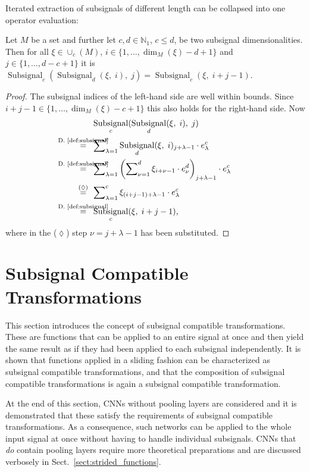\documentclass[journal]{IEEEtran}
\newcommand{\N}{\mathbb{N}}
\newcommand{\discint}[2]{\{#1,\dotsc,#2\}}
\newcommand{\inint}[2]{\in\discint{#1}{#2}}
\DeclareMathOperator{\Subsignal}{Subsignal}
\newcommand{\equsing}[1]{\overset{\mathclap{\text{#1}}}{=}}
\begin{document}
Iterated extraction of subsignals of different length can be collapsed into one operator evaluation:
\begin{lemma}
\label{lem:subsignal-composition}
Let $M$ be a set and further let $c,d\in\N_1$, $c\leq d$, be two subsignal dimensionalities.
Then for all $\xi\in\cup_c(M)$, $i\inint{1}{\dim_M(\xi) - d + 1}$ and $j\inint{1}{d - c + 1}$ it is $\Subsignal_c(\Subsignal_d(\xi,\; i),\; j) = \Subsignal_c(\xi,\; i + j - 1)$.
\end{lemma}
\begin{proof}
The subsignal indices of the left-hand side are well within bounds.
Since $i + j - 1 \inint{1}{\dim_M(\xi) - c + 1}$ this also holds for the right-hand side.
Now
\begin{align*}
     & \Subsignal_c(\Subsignal_d(\xi,\; i),\; j)\\
  \equsing{D.~\ref{def:subsignal}}\ \ & \sum\nolimits_{\lambda = 1}^c\Subsignal_d(\xi,\;i)_{j + \lambda - 1}\cdot e_\lambda^c\\
  \equsing{D.~\ref{def:subsignal}}\ \ & \sum\nolimits_{\lambda = 1}^c\left(\sum\nolimits_{\nu = 1}^d \xi_{i + \nu - 1}\cdot e_\nu^d\right)_{j + \lambda - 1}\cdot e_\lambda^c\\
  \equsing{($\lozenge$)}\ \ & \sum\nolimits_{\lambda = 1}^c \xi_{(i + j - 1) + \lambda - 1}\cdot e_\lambda^c\\
  \equsing{D.~\ref{def:subsignal}}\ \ & \Subsignal_c(\xi,\; i + j - 1)\text{,}
\end{align*}
where in the ($\lozenge$) step $\nu = j + \lambda - 1$ has been substituted.
\end{proof}

\section{Subsignal Compatible Transformations}
\label{sect:subsignal-compatible-transformations}
This section introduces the concept of subsignal compatible transformations.
These are functions that can be applied to an entire signal at once and then yield the same result as if they had been applied to each subsignal independently.
It is shown that functions applied in a sliding fashion can be characterized as subsignal compatible transformations, and that the composition of subsignal compatible transformations is again a subsignal compatible transformation.

At the end of this section, CNNs without pooling layers are considered and it is demonstrated that these satisfy the requirements of subsignal compatible transformations.
As a consequence, such networks can be applied to the whole input signal at once without having to handle individual subsignals.
CNNs that \emph{do} contain pooling layers require more theoretical preparations and are discussed verbosely in Sect.~\ref{sect:strided_functions}.
\end{document}
